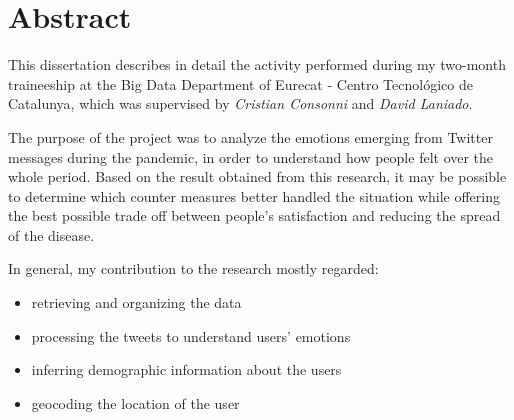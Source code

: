 
\chapter*{Abstract} %
\label{abstract}  


This dissertation describes in detail the activity performed during my two-month traineeship at the Big Data Department of Eurecat - Centro Tecnológico de Catalunya, which was supervised by \textit{Cristian Consonni} and \textit{David Laniado}.

The purpose of the project was to analyze the emotions emerging from Twitter messages during the pandemic, in order to understand how people felt over the whole period. Based on the result obtained from this research, it may be possible to determine which counter measures better handled the situation while offering the best possible trade off between people's satisfaction and reducing the spread of the disease.

In general, my contribution to the research mostly regarded:

\begin{itemize}
	\item retrieving and organizing the data
	\item processing the tweets to understand users' emotions
	\item inferring demographic information about the users
	\item geocoding the location of the user
\end{itemize}

